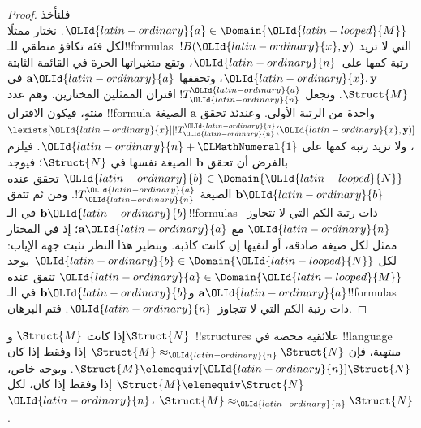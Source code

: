 \documentclass[../../../include/open-logic-section]{subfiles}
\begin{document}
\begin{proof}
  فلنأخذ ${\OLId{latin-ordinary}{a}} \in \Domain {\OLId{latin-looped}{M}}$. نختار ممثلًا لكل فئة تكافؤ منطقي
  للـ!!{formula}s~$!B({\OLId{latin-ordinary}{x}},\mathbf{y})$ التي لا تزيد رتبة كمها على~${\OLId{latin-ordinary}{n}}$،
  وتقع متغيراتها الحرة في القائمة الثابتة ${\OLId{latin-ordinary}{x}},\mathbf{y}$،
  وتحققها $\mathbf{a}{\OLId{latin-ordinary}{a}}$ في $\Struct{M}$. ونجعل $!T^{\OLId{latin-ordinary}{a}}_{\OLId{latin-ordinary}{n}}$
  اقتران الممثلين المختارين. وهم عدد منتهٍ، فيكون الاقتران
  !!{formula} واحدة من الرتبة الأولى. وعندئذ تحقق $\mathbf{a}$
  الصيغة $\lexists[{\OLId{latin-ordinary}{x}}][!T^{\OLId{latin-ordinary}{a}}_{\OLId{latin-ordinary}{n}}({\OLId{latin-ordinary}{x}},\mathbf{y})]$، ولا تزيد رتبة
  كمها على ${\OLId{latin-ordinary}{n}}+{\OLMathNumeral{1}}$. فيلزم بالفرض أن تحقق $\mathbf{b}$ الصيغة
  نفسها في $\Struct{N}$؛ فيوجد ${\OLId{latin-ordinary}{b}} \in \Domain {\OLId{latin-looped}{N}}$ تحقق عنده
  $\mathbf{b}{\OLId{latin-ordinary}{b}}$ الصيغة $!T^{\OLId{latin-ordinary}{a}}_{\OLId{latin-ordinary}{n}}$. ومن ثم تتفق $\mathbf{b}{\OLId{latin-ordinary}{b}}$
  في الـ!!{formula}s ذات رتبة الكم التي لا تتجاوز~${\OLId{latin-ordinary}{n}}$
  مع $\mathbf{a}{\OLId{latin-ordinary}{a}}$؛ إذ في المختار ممثل لكل صيغة صادقة،
  أو لنفيها إن كانت كاذبة. وبنظير هذا النظر نثبت جهة الإياب:
  لكل ${\OLId{latin-ordinary}{b}} \in \Domain {\OLId{latin-looped}{N}}$ يوجد ${\OLId{latin-ordinary}{a}}\in \Domain {\OLId{latin-looped}{M}}$ تتفق عنده
  $\mathbf{a}{\OLId{latin-ordinary}{a}}$ و$\mathbf{b}{\OLId{latin-ordinary}{b}}$ في الـ!!{formula}s ذات رتبة
  الكم التي لا تتجاوز~${\OLId{latin-ordinary}{n}}$. فتم البرهان.
\end{proof}

\begin{cor}
  إذا كانت $\Struct{M}$ و$\Struct{N}$~!!{structure}s علائقية محضة في
  !!{language} منتهية، فإن $\Struct{M} \approx_{\OLId{latin-ordinary}{n}}\Struct{N}$ إذا وفقط
  إذا كان $\Struct{M} \elemequiv[{\OLId{latin-ordinary}{n}}] \Struct{N}$. وبوجه خاص،
  $\Struct{M} \elemequiv \Struct{N}$ إذا وفقط إذا كان، لكل ${\OLId{latin-ordinary}{n}}$،
  $\Struct{M} \approx_{\OLId{latin-ordinary}{n}} \Struct{N}$.
\end{cor}
\end{document}
